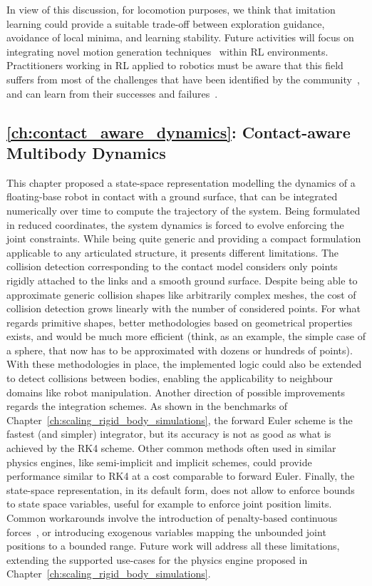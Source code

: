 In view of this discussion, for locomotion purposes, we think that imitation learning could provide a suitable trade-off between exploration guidance, avoidance of local minima, and learning stability.
Future activities will focus on integrating novel motion generation techniques~\parencite{viceconte_adherent_2022} within \ac{RL} environments.
Practitioners working in \ac{RL} applied to robotics must be aware that this field suffers from most of the challenges that have been identified by the community~\parencite{dulac-arnold_empirical_2021}, and can learn from their successes and failures~\parencite{ibarz_how_2021}.

\subsection*{\autoref{ch:contact_aware_dynamics}: Contact-aware Multibody Dynamics}

This chapter proposed a state-space representation modelling the dynamics of a floating-base robot in contact with a ground surface, that can be integrated numerically over time to compute the trajectory of the system.
Being formulated in reduced coordinates, the system dynamics is forced to evolve enforcing the joint constraints.
While being quite generic and providing a compact formulation applicable to any articulated structure, it presents different limitations.
The collision detection corresponding to the contact model considers only points rigidly attached to the links and a smooth ground surface.
Despite being able to approximate generic collision shapes like arbitrarily complex meshes, the cost of collision detection grows linearly with the number of considered points.
For what regards primitive shapes, better methodologies based on geometrical properties exists, and would be much more efficient (think, as an example, the simple case of a sphere, that now has to be approximated with dozens or hundreds of points).
With these methodologies in place, the implemented logic could also be extended to detect collisions between bodies, enabling the applicability to neighbour domains like robot manipulation.
Another direction of possible improvements regards the integration schemes.
As shown in the benchmarks of Chapter~\ref{ch:scaling_rigid_body_simulations}, the forward Euler scheme is the fastest (and simpler) integrator, but its accuracy is not as good as what  is achieved by the \ac{RK4} scheme.
Other common methods often used in similar physics engines, like semi-implicit and implicit schemes, could provide performance similar to \ac{RK4} at a cost comparable to forward Euler.
Finally, the state-space representation, in its default form, does not allow to enforce bounds to state space variables, useful for example to enforce joint position limits.
Common workarounds involve the introduction of penalty-based continuous forces~\parencite{xu_accelerated_2022}, or introducing exogenous variables mapping the unbounded joint positions to a bounded range.
Future work will address all these limitations, extending the supported use-cases for the physics engine proposed in Chapter~\ref{ch:scaling_rigid_body_simulations}.

